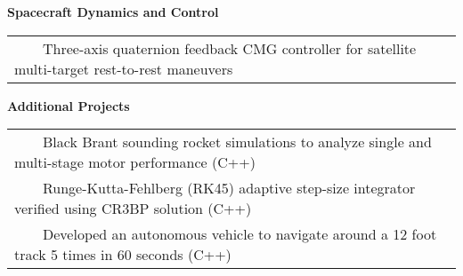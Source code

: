 \documentclass[overlapped, 11pt]{res}
\newcommand{\tabitem}{~~\textbullet~~}
\begin{document}
\begin{resume}
\begin{itemize}
            \textbf{Spacecraft Dynamics and Control} \\
                \begin{tabular}{l}
                    \tabitem Three-axis quaternion feedback CMG controller for satellite multi-target rest-to-rest maneuvers\\
                \end{tabular}
                
                
                
                
            \textbf{Additional Projects} \\
                \begin{tabular}{l}
                    \tabitem Black Brant sounding rocket simulations to analyze single and multi-stage motor performance (C++)\\
                    \tabitem Runge-Kutta-Fehlberg (RK45) adaptive step-size integrator verified using CR3BP solution (C++)\\
                    \tabitem Developed an autonomous vehicle to navigate around a 12 foot track 5 times in 60 seconds (C++)\\
                \end{tabular}
                

\end{itemize}
\end{resume}
\end{document}
